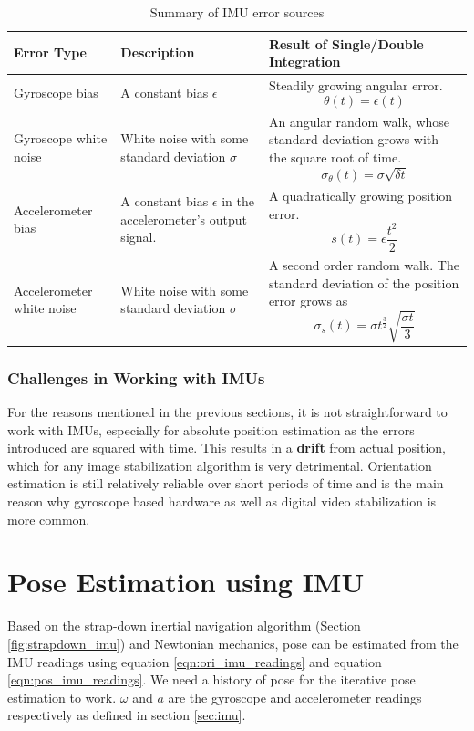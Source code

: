 \begin{table}[H]
\centering
\begin{tabular}{ l| L| L }
     Error Type & Description & Result of Single/Double Integration \\ 
     \hline
     Gyroscope bias & 
     A constant bias $ \epsilon $ & 
     Steadily growing angular error.  \[\theta(t) = \epsilon(t)\] \\
     \hline
     Gyroscope white noise & 
     White noise with some standard deviation $ \sigma $ & 
     An angular random walk, whose standard deviation grows with the square root of time. 
     \[\sigma_\theta(t) = \sigma \sqrt{\delta t}\] \\
     
     \hline
     Accelerometer bias & 
     A constant bias $ \epsilon $ in the accelerometer's output signal. & 
     A quadratically growing position error. \[s(t) = \epsilon  \frac{t^{2}}{2}\]   \\
     \hline
     Accelerometer white noise & 
     White noise with some standard deviation $ \sigma $ & 
     A second order random walk. The standard deviation of the position error grows as
     \[\sigma_s(t) = \sigma  t^{\frac{3}{2}}  \sqrt{\frac{\sigma  t}{3}}\]   \\
     
\end{tabular}
    \caption{Summary of IMU error sources \citep{woodman2007introduction}}
    \label{tab:imu_error_char}
\end{table}

\subsubsection{Challenges in Working with IMUs}
For the reasons mentioned in the previous sections, it is not straightforward to work with IMUs, especially for absolute position estimation as the errors introduced are squared with time. This results in a \textbf{drift} from actual position, which for any image stabilization algorithm is very detrimental. Orientation estimation is still relatively reliable over short periods of time and is the main reason why gyroscope based hardware as well as digital video stabilization is more common.

\section{Pose Estimation using IMU}
Based on the strap-down inertial navigation algorithm (Section \ref{fig:strapdown_imu}) and Newtonian mechanics, pose can be estimated from the IMU readings using equation \ref{eqn:ori_imu_readings} and equation \ref{eqn:pos_imu_readings}. We need a history of pose for the iterative pose estimation to work. $ \omega $ and $ a $ are the gyroscope and accelerometer readings respectively as defined in section \ref{sec:imu}.

